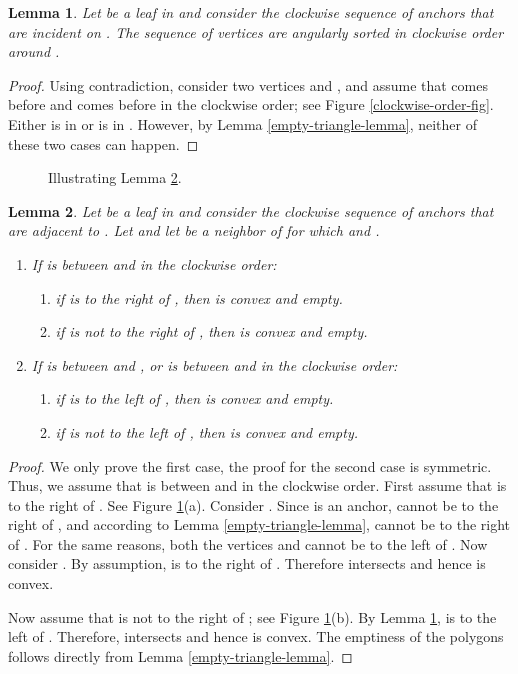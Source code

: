 \documentclass[11pt,a4paper]{article}
\newtheorem{lemma}{Lemma}
\begin{document}
\begin{lemma}
\label{clockwise-order-lemma}
Let  be a leaf in  and consider the clockwise sequence  of anchors that are incident on . The sequence of vertices  are angularly sorted in clockwise order around . 
\end{lemma}
\begin{proof}
 Using contradiction, consider two vertices  and , and assume that  comes before  and  comes before  in the clockwise order; see Figure \ref{clockwise-order-fig}. Either  is in  or  is in . However, by Lemma \ref{empty-triangle-lemma}, neither of these two cases can happen.
\end{proof}

\begin{figure}[ht]
  \centering
\setlength{\tabcolsep}{0in}
  
  \caption{Illustrating Lemma \ref{anchor2-vertex1-lemma}.}
\label{anchor2-vertex1-1-fig}
\end{figure}

\begin{lemma}
\label{anchor2-vertex1-lemma}
Let  be a leaf in  and consider the clockwise sequence  of anchors that are adjacent to . Let  and let  be a neighbor of  for which  and . 
\begin{enumerate}
 \item If  is between  and  in the clockwise order:
    \begin{enumerate}
      \item if  is to the right of , then  is convex and empty.
      \item if  is not to the right of , then  is convex and empty.
    \end{enumerate}
  \item If  is between  and , or  is between  and  in the clockwise order:
    \begin{enumerate}
      \item if  is to the left of , then  is convex and empty.
      \item if  is not to the left of , then  is convex and empty.
    \end{enumerate}
\end{enumerate}
\end{lemma}

\begin{proof}
We only prove the first case, the proof for the second case is symmetric. Thus, we assume that  is between  and  in the clockwise order. First assume that  is to the right of . See Figure \ref{anchor2-vertex1-1-fig}(a). Consider . Since  is an anchor,  cannot be to the right of , and according to Lemma \ref{empty-triangle-lemma},  cannot be to the right of . For the same reasons, both the vertices  and  cannot be to the left of . Now consider . By assumption,  is to the right of . Therefore  intersects  and hence  is convex.

Now assume that  is not to the right of ; see Figure \ref{anchor2-vertex1-1-fig}(b). By Lemma \ref{clockwise-order-lemma},  is to the left of . Therefore,  intersects  and hence  is convex. 
The emptiness of the polygons follows directly from Lemma \ref{empty-triangle-lemma}.
\end{proof}
\end{document}
